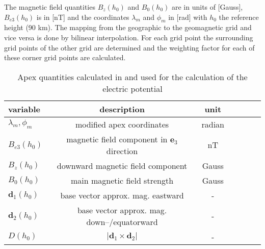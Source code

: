 The magnetic field quantities $B_z(h_0)$ and $B_0(h_0)$ are in units of [Gauss], 
$B_{e3}(h_0)$ is in [nT] and the coordinates $\lambda_m$ and $\phi_m$ in [rad]
with $h_0$ the reference height (90 km).
The mapping from the geographic to the geomagnetic grid and vice versa 
is done by  bilinear
interpolation. For each grid
point the surrounding grid points of the other grid are determined and 
the weighting
factor for each of these corner grid points are calculated.
%
\begin{table}[tb]
\begin{tabular}{|p{3.0cm} ||c|c|c|c|c|c|} \hline
 variable                        & description & unit   \\ \hline \hline
%
$\lambda_m, \phi_m$  & modified apex coordinates& radian   \\ 
$B_{e3}(h_0)$        & magnetic field component in $\mathbf{e}_3$ direction &  nT  \\ 
$B_z(h_0)$           & downward magnetic field component  &  Gauss  \\ 
$B_0(h_0)$           & main magnetic field strength & Gauss    \\
$\mathbf{d}_1(h_0)$    & base vector approx. mag. eastward &  -  \\
$\mathbf{d}_2(h_0)$    & base vector approx. mag. down--/equatorward &  -   \\ 
$ D(h_0)$              & $|\mathbf{d}_1\times \mathbf{d}_2|$ &   -  \\ \hline
\end{tabular}
\caption{Apex quantities calculated in  and used for the
calculation of the electric potential}
\label{tab:apxparm_dynamo}
\end{table}  
%
